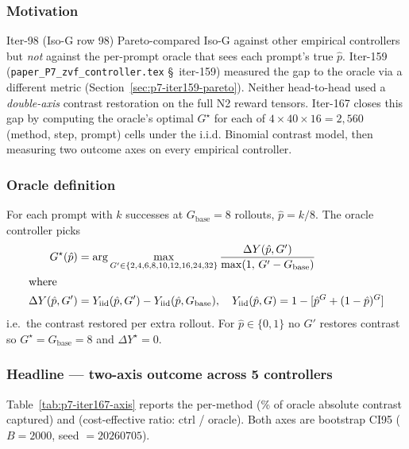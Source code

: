 
\subsubsection*{Motivation}

Iter-98 (Iso-G row 98) Pareto-compared Iso-G against other empirical
controllers but \emph{not} against the per-prompt oracle that sees each
prompt's true $\hat p$. Iter-159 (\texttt{paper\_P7\_zvf\_controller.tex}
\S~iter-159) measured the gap to the oracle via a different metric
(Section~\ref{sec:p7-iter159-pareto}). Neither head-to-head used a
\emph{double-axis} contrast restoration on the full N2 reward tensors.
Iter-167 closes this gap by computing the oracle's optimal $G^\star$ for
each of $4 \times 40 \times 16 = 2{,}560$ (method, step, prompt) cells
under the i.i.d. Binomial contrast model, then measuring two outcome axes
on every empirical controller.

\subsubsection*{Oracle definition}

For each prompt with $k$ successes at $G_{\mathrm{base}}=8$ rollouts,
$\hat p = k / 8$. The oracle controller picks
\begin{align}
G^\star(\hat p)
  &= \arg\max_{G' \in \{2,4,6,8,10,12,16,24,32\}}
     \frac{\Delta Y(\hat p, G')}{\max(1,\, G' - G_{\mathrm{base}})} \label{eq:iter167-oracle}\\
\intertext{where}
\Delta Y(\hat p, G')
  &= Y_{\mathrm{iid}}(\hat p, G') - Y_{\mathrm{iid}}(\hat p, G_{\mathrm{base}}), \quad
Y_{\mathrm{iid}}(\hat p, G) = 1 - [\hat p^G + (1-\hat p)^G] \nonumber
\end{align}
i.e.\ the contrast restored per extra rollout. For $\hat p \in \{0, 1\}$ no
$G'$ restores contrast so $G^\star = G_{\mathrm{base}} = 8$ and
$\Delta Y^\star = 0$.

\subsubsection*{Headline --- two-axis outcome across 5 controllers}

Table~\ref{tab:p7-iter167-axis} reports the per-method (\% of oracle
absolute contrast captured) and (cost-effective ratio: ctrl / oracle).
Both axes are bootstrap CI95 ($B = 2000$, seed $= 20260705$).

